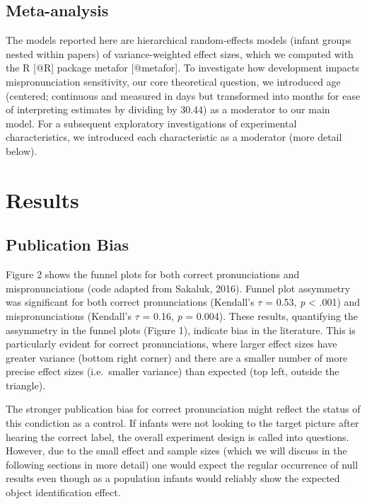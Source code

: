 \documentclass[man]{apa6}
\theoremstyle{definition}
\theoremstyle{definition}
\theoremstyle{definition}
\theoremstyle{remark}
\begin{document}
\subsection{Meta-analysis}\label{meta-analysis}

The models reported here are hierarchical random-effects models (infant
groups nested within papers) of variance-weighted effect sizes, which we
computed with the R {[}@R{]} package metafor {[}@metafor{]}. To
investigate how development impacts mispronunciation sensitivity, our
core theoretical question, we introduced age (centered; continuous and
measured in days but transformed into months for ease of interpreting
estimates by dividing by 30.44) as a moderator to our main model. For a
subsequent exploratory investigations of experimental characteristics,
we introduced each characteristic as a moderator (more detail below).

\section{Results}\label{results}

\subsection{Publication Bias}\label{publication-bias-1}

Figure 2 shows the funnel plots for both correct pronunciations and
mispronunciations (code adapted from Sakaluk, 2016). Funnel plot
assymmetry was significant for both correct pronunciations (Kendall's
\(\tau\) = 0.53, \emph{p} \textless{} .001) and mispronunciations
(Kendall's \(\tau\) = 0.16, \emph{p} = 0.004). These results,
quantifying the assymmetry in the funnel plots (Figure 1), indicate bias
in the literature. This is particularly evident for correct
pronunciations, where larger effect sizes have greater variance (bottom
right corner) and there are a smaller number of more precise effect
sizes (i.e.~smaller variance) than expected (top left, outside the
triangle).

The stronger publication bias for correct pronunciation might reflect
the status of this condiction as a control. If infants were not looking
to the target picture after hearing the correct label, the overall
experiment design is called into questions. However, due to the small
effect and sample sizes (which we will discuss in the following sections
in more detail) one would expect the regular occurrence of null results
even though as a population infants would reliably show the expected
object identification effect.
\end{document}

